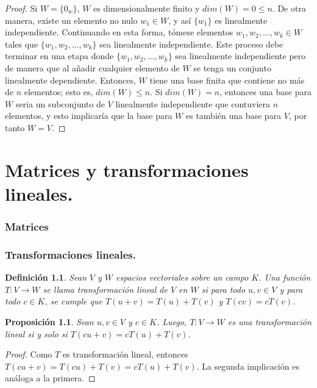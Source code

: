 \documentclass{book}
\newtheorem{proposition}{Proposición}
\newtheorem{definition}{Definición}
\begin{document}
\begin{proof}
Si $W=\{0_w\}$, $W$ es dimensionalmente finito y $dim(W)=0\leq n$. De otra manera, existe un elemento no nulo $w_1\in W$, y así $\{w_1\}$ es linealmente independiente. Continuando en esta forma, tómese elementos $w_1,w_2,...,w_k\in W$ tales que $\{w_1,w_2,...,w_k \}$ sea linealmente independiente. Este proceso debe terminar en una etapa donde $\{w_1,w_2,...,w_k \}$ sea linealmente independiente pero de manera que al añadir cualquier elemento de $W$ se tenga un conjunto linealmente dependiente. Entonces, $W$ tiene una base finita que contiene no más de $n$ elementos; esto es, $dim(W)\leq n$. Si $dim(W)=n$, entonces una base para $W$ seria un subconjunto de $V$ linealmente independiente que contuviera $n$ elementos, y esto implicaría que la base para $W$ es también una base para $V$, por tanto $W=V$.
\end{proof}

\chapter{Matrices y transformaciones lineales.}
\subsection{Matrices}
\subsection{Transformaciones lineales.}

\begin{definition}
Sean $V$ y $W$ espacios vectoriales sobre un campo $K$. Una función $T:V\rightarrow W$ se llama transformación lineal de $V$ en $W$ si para todo $u,v\in V$ y para todo $c\in K$, se cumple que $T(u+v)=T(u)+T(v)$ y $T(cv)=cT(v)$.

\end{definition}

\begin{proposition}

Sean $u,v\in V$ y $c\in K$. Luego, $T:V\rightarrow W$ es una transformación lineal si y solo si $T(cu+v)=cT(u)+T(v)$.

\end{proposition}

\begin{proof}

Como $T$ es transformación lineal, entonces $T(cu+v)=T(cu)+T(v)=cT(u)+T(v)$. La segunda implicación es análoga a la primera.

\end{proof}
\end{document}
